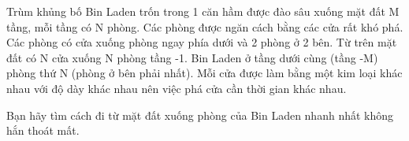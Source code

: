 Trùm khủng bố Bin Laden trốn trong 1 căn hầm được đào sâu xuống mặt đất M tầng, mỗi tầng có N phòng. Các phòng được ngăn cách bằng các cửa rất khó phá. Các phòng có cửa xuống phòng ngay phía dưới và 2 phòng ở 2 bên. Từ trên mặt đất có N cửa xuống N phòng tầng -1. Bin Laden ở tầng dưới cùng (tầng -M) phòng thứ N (phòng ở bên phải nhất). Mỗi cửa được làm bằng một kim loại khác nhau với độ dày khác nhau nên việc phá cửa cần thời gian khác nhau.

Bạn hãy tìm cách đi từ mặt đất xuống phòng của Bin Laden nhanh nhất không hắn thoát mất.